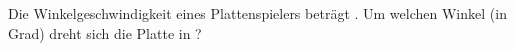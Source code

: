 Die Winkelgeschwindigkeit eines Plattenspielers beträgt \omO. Um welchen Winkel (in Grad) dreht sich die Platte in \tpO?
